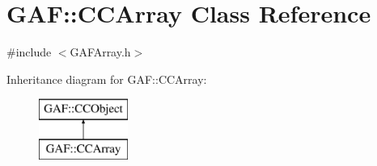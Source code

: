 \hypertarget{class_g_a_f_1_1_c_c_array}{\section{G\-A\-F\-:\-:C\-C\-Array Class Reference}
\label{class_g_a_f_1_1_c_c_array}
}


{\ttfamily \#include $<$G\-A\-F\-Array.\-h$>$}

Inheritance diagram for G\-A\-F\-:\-:C\-C\-Array\-:\begin{figure}[H]
\begin{center}
\leavevmode
\includegraphics[height=2.000000cm]{class_g_a_f_1_1_c_c_array}
\end{center}
\end{figure}

